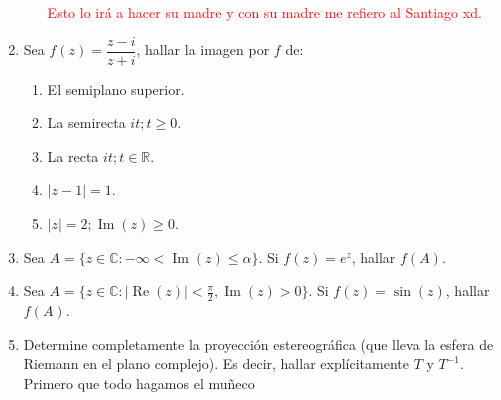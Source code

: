 \documentclass[11pt]{article}
\begin{document}
\begin{enumerate}
\begin{enumerate}
        \textcolor{red}{Esto lo irá a hacer su madre y con su madre me refiero al Santiago xd.}

    \end{enumerate}

    \item  Sea \( f(z) = \dfrac{z - i}{z + i} \), hallar la imagen por \( f \) de:
    \begin{enumerate}
        \item El semiplano superior.\\

        \item La semirecta \( it; t \geq 0 \).
        \item La recta \( it; t \in \mathbb{R} \).
        \item \( |z - 1| = 1 \).
        \item \( |z| = 2; \operatorname{Im}(z) \geq 0 \).
    \end{enumerate}

    \item Sea \( A = \{ z \in \mathbb{C} : -\infty < \operatorname{Im}(z) \leq \alpha \} \). Si \( f(z) = e^z \), hallar \( f(A) \).

    \item Sea \( A = \{ z \in \mathbb{C} : |\operatorname{Re}(z)| < \frac{\pi}{2}, \operatorname{Im}(z) > 0 \} \). Si \( f(z) = \sin(z) \), hallar \( f(A) \).

    \item Determine completamente la proyección estereográfica (que lleva la esfera de Riemann en el plano complejo). Es decir, hallar explícitamente \( T \) y \( T^{-1} \).\\

Primero que todo hagamos el muñeco

\begin{center} 

\begin{tikzpicture}[x=0.75pt,y=0.75pt,yscale=-1.6,xscale=1.6]


\end{tikzpicture}
\end{center}
\end{enumerate}
\end{document}
